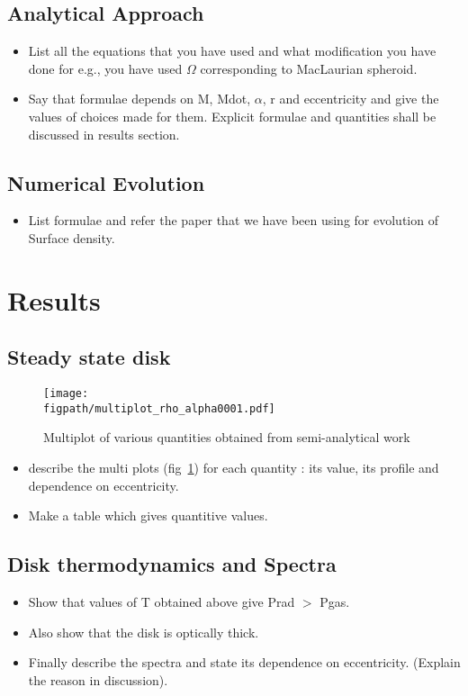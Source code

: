 \documentclass[useAMS,usenatbib]{mn2e}
\newcommand{\figpath}{./Figs/}
\begin{document}
\subsection{Analytical Approach}
\begin{itemize}
\item List all the equations that you have used and what modification
  you have done for e.g., you have used $\Omega$ corresponding to
  MacLaurian spheroid. 
\item Say that formulae depends on M, Mdot, $\alpha$, r and
  eccentricity and give the values of choices made for them. 
  Explicit formulae and quantities shall be discussed in results
  section.
\end{itemize}
\subsection{Numerical Evolution}
\begin{itemize}
\item List formulae and refer the paper that we have been using for
  evolution of Surface density. 
\end{itemize}

\section{Results}
\subsection{Steady state disk}
\begin{figure}
\centering
\texttt{[image: \\figpath/multiplot\_rho\_alpha0001.pdf]}
\caption{Multiplot of various quantities obtained from semi-analytical
  work}
\label{fig:steadyplt1}
\end{figure}

\begin{itemize}
\item describe the multi plots (fig~\ref{fig:steadyplt1}) for each quantity : its value, its
  profile and dependence on eccentricity.
\item Make a table which gives quantitive values.  
\end{itemize}


\subsection{Disk thermodynamics and Spectra}
\begin{itemize}
\item Show that values of T obtained above give Prad $>$ Pgas. 
\item Also show that the disk is optically thick.
\item Finally describe the spectra and state its dependence on
  eccentricity. (Explain the reason in discussion).
\end{itemize}
\end{document}

